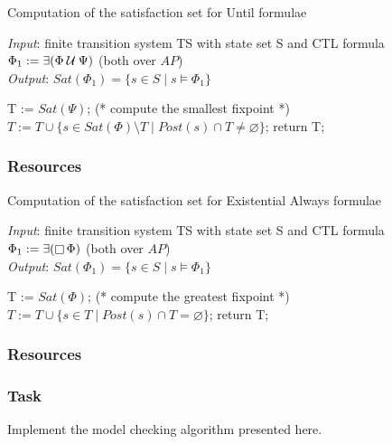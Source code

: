 \documentclass{article}
\begin{document}
\begin{algorithm}[H]
    \caption{Computation of the satisfaction set for Until formulae}
    \hspace*{\algorithmicindent} \emph{Input}: finite transition system TS with state set S and CTL formula $\Phi_1 := \exists (\Phi \mathbin{\mathcal{U}} \Psi)$ (both over $AP$) \\
    \hspace*{\algorithmicindent} \emph{Output}: $Sat(\Phi_1) = \{ s \in S \mid s \vDash \Phi_1 \}$
    \begin{algorithmic}[1]
        \State T := $Sat(\Psi)$; (* compute the smallest fixpoint *)
            \State $ T := T \cup \{ s \in Sat(\Phi) \setminus T \mid Post(s) \cap T \neq \varnothing \} $;
        \EndWhile
    \State return T;
    \end{algorithmic}
\end{algorithm}
\subsubsection{Resources}
\cite[Paragraph 6.4]{BaKa}

\begin{algorithm}[H]
    \caption{Computation of the satisfaction set for Existential Always formulae}
    \hspace*{\algorithmicindent} \emph{Input}: finite transition system TS with state set S and CTL formula $\Phi_1 := \exists (\mathop{\square} \Phi)$ (both over $AP$) \\
    \hspace*{\algorithmicindent} \emph{Output}: $Sat(\Phi_1) = \{ s \in S \mid s \vDash \Phi_1  \}$
    \begin{algorithmic}[1]
        \State T := $Sat(\Phi)$; (* compute the greatest fixpoint *)
            \State $ T := T \cup \{ s \in T \mid Post(s) \cap T = \varnothing \} $;
        \EndWhile
    \State return T;
    \end{algorithmic}
\end{algorithm}
\subsubsection{Resources}
\cite[Paragraph 6.4]{BaKa}

\color{red}
\subsubsection*{Task}
Implement the model checking algorithm presented here.
\color{black}
\end{document}
